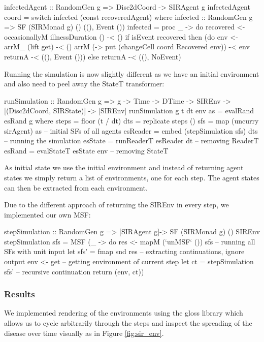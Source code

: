 \begin{HaskellCode}
infectedAgent :: RandomGen g => Disc2dCoord -> SIRAgent g
infectedAgent coord = switch infected (const recoveredAgent)
  where
    infected :: RandomGen g => SF (SIRMonad g) () ((), Event ())
    infected = proc _ -> do
      recovered <- occasionallyM illnessDuration () -< ()
      if isEvent recovered
        then (do
          env <- arrM_ (lift get) -< ()
          arrM (\env -> put (changeCell coord Recovered env)) -< env
          returnA -< ((), Event ()))
        else returnA -< ((), NoEvent)
\end{HaskellCode}

Running the simulation is now slightly different as we have an initial environment and also need to peel away the StateT transformer:
\begin{HaskellCode}
runSimulation :: RandomGen g => g -> Time -> DTime -> SIREnv -> [(Disc2dCoord, SIRState)] -> [SIREnv]
runSimulation g t dt env as = evalRand esRand g
  where
    steps    = floor (t / dt)
    dts      = replicate steps ()
    sfs      = map (uncurry sirAgent) as      -- initial SFs of all agents
    esReader = embed (stepSimulation sfs) dts -- running the simulation
    esState  = runReaderT esReader dt         -- removing ReaderT
    esRand   = evalStateT esState env         -- removing StateT 
\end{HaskellCode}

As initial state we use the initial environment and instead of returning agent states we simply return a list of environments, one for each step. The agent states can then be extracted from each environment.

Due to the different approach of returning the SIREnv in every step, we implemented our own MSF:
\begin{HaskellCode}
stepSimulation :: RandomGen g => [SIRAgent g]-> SF (SIRMonad g) () SIREnv
stepSimulation sfs = MSF (\_ -> do
  res <- mapM (`unMSF` ()) sfs  -- running all SFs with unit input
  let sfs' = fmap snd res       -- extracting continuations, ignore output
  env <- get                    -- getting environment of current step
  let ct = stepSimulation sfs'  -- recursive continuation
  return (env, ct))
\end{HaskellCode}

\subsubsection{Results}
We implemented rendering of the environments using the gloss library which allows us to cycle arbitrarily through the steps and inspect the spreading of the disease over time visually as in Figure \ref{fig:sir_env}.

